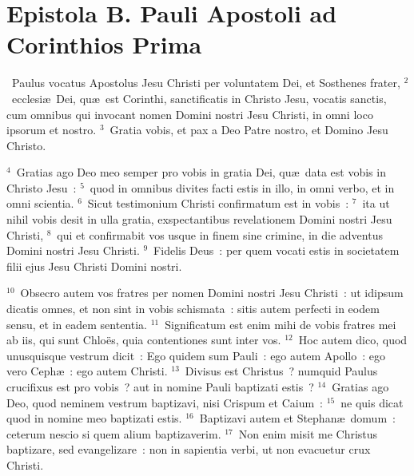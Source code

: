 {\centering \section*{Epistola B. Pauli Apostoli ad Corinthios Prima}}\thispagestyle{empty}

~Paulus vocatus Apostolus Jesu Christi per voluntatem Dei, et Sosthenes frater,
${}^{2}$~ecclesi\ae\ Dei, qu\ae\ est Corinthi, sanctificatis in Christo Jesu, vocatis sanctis, cum omnibus qui invocant nomen Domini nostri Jesu Christi, in omni loco ipsorum et nostro.
${}^{3}$~Gratia vobis, et pax a Deo Patre nostro, et Domino Jesu Christo.


${}^{4}$~Gratias ago Deo meo semper pro vobis in gratia Dei, qu\ae\ data est vobis in Christo Jesu~:
${}^{5}$~quod in omnibus divites facti estis in illo, in omni verbo, et in omni scientia.
${}^{6}$~Sicut testimonium Christi confirmatum est in vobis~:
${}^{7}$~ita ut nihil vobis desit in ulla gratia, exspectantibus revelationem Domini nostri Jesu Christi,
${}^{8}$~qui et confirmabit vos usque in finem sine crimine, in die adventus Domini nostri Jesu Christi.
${}^{9}$~Fidelis Deus~: per quem vocati estis in societatem filii ejus Jesu Christi Domini nostri.


${}^{10}$~Obsecro autem vos fratres per nomen Domini nostri Jesu Christi~: ut idipsum dicatis omnes, et non sint in vobis schismata~: sitis autem perfecti in eodem sensu, et in eadem sententia.
${}^{11}$~Significatum est enim mihi de vobis fratres mei ab iis, qui sunt Chlo\"es, quia contentiones sunt inter vos.
${}^{12}$~Hoc autem dico, quod unusquisque vestrum dicit~: Ego quidem sum Pauli~: ego autem Apollo~: ego vero Ceph\ae~: ego autem Christi.
${}^{13}$~Divisus est Christus~? numquid Paulus crucifixus est pro vobis~? aut in nomine Pauli baptizati estis~?
${}^{14}$~Gratias ago Deo, quod neminem vestrum baptizavi, nisi Crispum et Caium~:
${}^{15}$~ne quis dicat quod in nomine meo baptizati estis.
${}^{16}$~Baptizavi autem et Stephan\ae\ domum~: ceterum nescio si quem alium baptizaverim.
${}^{17}$~Non enim misit me Christus baptizare, sed evangelizare~: non in sapientia verbi, ut non evacuetur crux Christi.


